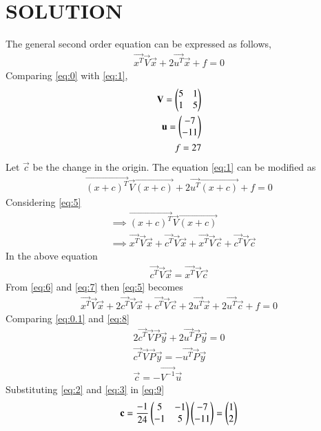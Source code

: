 \documentclass[journal,12pt,twocolumn]{IEEEtran}
\begin{document}
\section{SOLUTION}
The general second order equation can be expressed as follows,
\begin{align}
\vec{x^T}\vec{V}\vec{x}+2\vec{u^T}\vec{x}+f=0\label{eq:1}
\end{align}
Comparing \eqref{eq:0} with \eqref{eq:1},
\begin{align}
\mathbf{V} = \begin{pmatrix}5 & 1\\1 & 5\end{pmatrix}\label{eq:2}\\
\mathbf{u} = \begin{pmatrix}-7\\ -11\end{pmatrix}\label{eq:3}\\
f = 27\label{eq:4}
\end{align}
Let $\vec{c}$ be the change in the origin. The equation \eqref{eq:1} can be modified as
\begin{align}
\vec{(x+c)^T}\vec{V}\vec{(x+c)}+2\vec{u^T}\vec{(x+c)}+f=0\label{eq:5}
\end{align}
Considering \eqref{eq:5}
\begin{align}
&\implies \vec{(x+c)^T}\vec{V}\vec{(x+c)}\\
&\implies \vec{x^T}\vec{V}\vec{x}+\vec{c^T}\vec{V}\vec{x}+\vec{x^T}\vec{V}\vec{c}+\vec{c^T}\vec{V}\vec{c}\label{eq:6}
\end{align}
In the above equation
\begin{align}
\vec{c^T}\vec{V}\vec{x} = \vec{x^T}\vec{V}\vec{c}\label{eq:7}
\end{align}
From \eqref{eq:6} and \eqref{eq:7} then \eqref{eq:5} becomes
\begin{align}
\vec{x^T}\vec{V}\vec{x}+2\vec{c^T}\vec{V}\vec{x}+\vec{c^T}\vec{V}\vec{c}+2\vec{u^T}\vec{x}+2\vec{u^T}\vec{c}+f = 0\label{eq:8}
\end{align}
Comparing \eqref{eq:0.1} and \eqref{eq:8}
\begin{align}
2\vec{c^T}\vec{V}\vec{P}\vec{y} + 2\vec{u^T}\vec{P}\vec{y} =0\\
\vec{c^T}\vec{V}\vec{P}\vec{y} = - \vec{u^T}\vec{P}\vec{y}\\
\vec{c} = -\vec{V^{-1}}\vec{u}\label{eq:9}
\end{align}
Substituting \eqref{eq:2} and \eqref{eq:3} in \eqref{eq:9}
\begin{align}
\mathbf{c}=\frac{-1}{24}\begin{pmatrix}5&-1\\-1&5\end{pmatrix}\begin{pmatrix}-7\\-11\end{pmatrix}=\begin{pmatrix}1\\2 \end{pmatrix}\label{eq:10}
\end{align}
\end{document}
